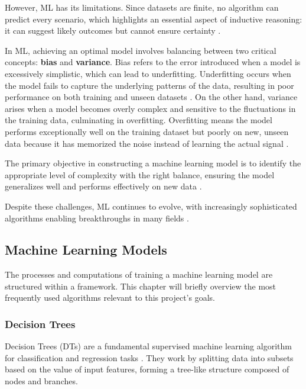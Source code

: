 However, \gls{ML} has its limitations. 
Since datasets are finite, no algorithm can predict every scenario, which highlights an essential aspect of inductive reasoning: it can suggest likely outcomes but cannot ensure certainty \parencite{Mohri2012, Suthaharan2016}. 

In \gls{ML}, achieving an optimal model involves balancing between two critical concepts: \textbf{bias} and \textbf{variance}. 
Bias refers to the error introduced when a model is excessively simplistic, which can lead to underfitting. 
Underfitting occurs when the model fails to capture the underlying patterns of the data, resulting in poor performance on both training and unseen datasets \parencite{ElSahly2023}. 
On the other hand, variance arises when a model becomes overly complex and sensitive to the fluctuations in the training data, culminating in overfitting. 
Overfitting means the model performs exceptionally well on the training dataset but poorly on new, unseen data because it has memorized the noise instead of learning the actual signal \parencite{ElSahly2023}. 

The primary objective in constructing a machine learning model is to identify the appropriate level of complexity with the right balance, ensuring the model generalizes well and performs effectively on new data \parencite{Suthaharan2016}.

Despite these challenges, \gls{ML} continues to evolve, with increasingly sophisticated algorithms enabling breakthroughs in many fields \parencite{Mohri2012}. 

\subsection{Machine Learning Models}

The processes and computations of training a machine learning model are structured within a framework. 
This chapter will briefly overview the most frequently used algorithms relevant to this project's goals.

\subsubsection{Decision Trees}

Decision Trees (DTs) are a fundamental supervised machine learning algorithm for classification and regression tasks \parencite{Huang2024}. 
They work by splitting data into subsets based on the value of input features, forming a tree-like structure composed of nodes and branches.

